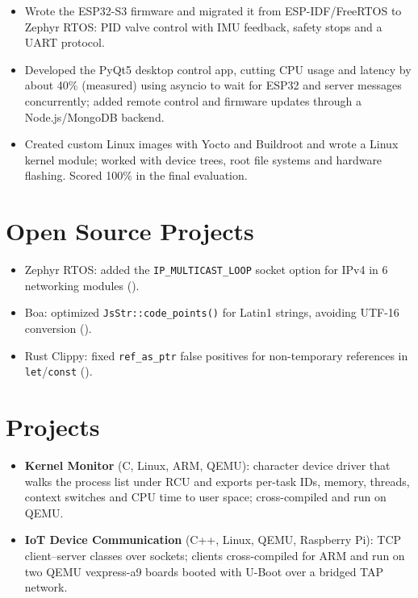 \documentclass[10pt]{article}
\begin{document}
\begin{itemize}
  \item Wrote the ESP32-S3 firmware and migrated it from ESP-IDF/FreeRTOS to Zephyr RTOS: PID valve control with IMU feedback, safety stops and a UART protocol.
  \item Developed the PyQt5 desktop control app, cutting CPU usage and latency by about 40\% (measured) using asyncio to wait for ESP32 and server messages concurrently; added remote control and firmware updates through a Node.js/MongoDB backend.
\end{itemize}
\begin{itemize}
  \item Created custom Linux images with Yocto and Buildroot and wrote a Linux kernel module; worked with device trees, root file systems and hardware flashing. Scored 100\% in the final evaluation.
\end{itemize}

\section*{Open Source Projects}
\begin{itemize}
  \item Zephyr RTOS: added the \texttt{IP\_MULTICAST\_LOOP} socket option for IPv4 in 6 networking modules ().
  \item Boa: optimized \texttt{JsStr::code\_points()} for Latin1 strings, avoiding UTF-16 conversion ().
  \item Rust Clippy: fixed \texttt{ref\_as\_ptr} false positives for non-temporary references in \texttt{let}/\texttt{const} ().
\end{itemize}

\section*{Projects}
\begin{itemize}
  \item \textbf{Kernel Monitor} (C, Linux, ARM, QEMU): character device driver that walks the process list under RCU and exports per-task IDs, memory, threads, context switches and CPU time to user space; cross-compiled and run on QEMU. 
  \item \textbf{IoT Device Communication} (C++, Linux, QEMU, Raspberry Pi): TCP client--server classes over sockets; clients cross-compiled for ARM and run on two QEMU vexpress-a9 boards booted with U-Boot over a bridged TAP network. 
\end{itemize}
\end{document}
